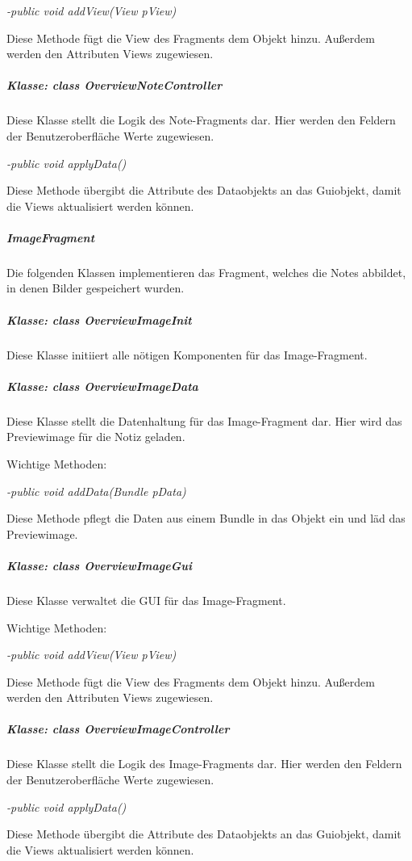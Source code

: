 \textit{-public void addView(View pView)}

Diese Methode fügt die View des Fragments dem Objekt hinzu. Außerdem werden den Attributen Views zugewiesen.

\subparagraph*{Klasse: class OverviewNoteController}

Diese Klasse stellt die Logik des Note-Fragments dar. Hier werden den Feldern der Benutzeroberfläche Werte zugewiesen.

\textit{-public void applyData()}

Diese Methode übergibt die Attribute des Dataobjekts an das Guiobjekt, damit die Views aktualisiert werden können.

\subparagraph{ImageFragment}

Die folgenden Klassen implementieren das Fragment, welches die Notes abbildet, in denen Bilder gespeichert wurden.

\subparagraph*{Klasse: class OverviewImageInit}

Diese Klasse initiiert alle nötigen Komponenten für das Image-Fragment.

\subparagraph*{Klasse: class OverviewImageData}

Diese Klasse stellt die Datenhaltung für das Image-Fragment dar. Hier wird das Previewimage für die Notiz geladen.

Wichtige Methoden:

\textit{-public void addData(Bundle pData)}

Diese Methode pflegt die Daten aus einem Bundle in das Objekt ein und läd das Previewimage.

\subparagraph*{Klasse: class OverviewImageGui}

Diese Klasse verwaltet die GUI für das Image-Fragment.

Wichtige Methoden:

\textit{-public void addView(View pView)}

Diese Methode fügt die View des Fragments dem Objekt hinzu. Außerdem werden den Attributen Views zugewiesen.

\subparagraph*{Klasse: class OverviewImageController}

Diese Klasse stellt die Logik des Image-Fragments dar. Hier werden den Feldern der Benutzeroberfläche Werte zugewiesen.

\textit{-public void applyData()}

Diese Methode übergibt die Attribute des Dataobjekts an das Guiobjekt, damit die Views aktualisiert werden können.

